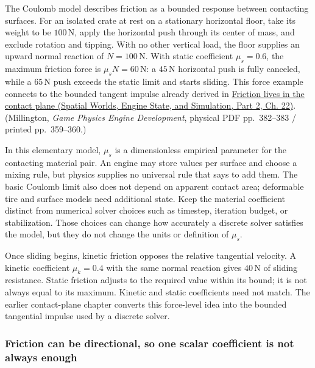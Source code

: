 The Coulomb model describes friction as a bounded response between contacting surfaces. For an isolated crate at rest on a stationary horizontal floor, take its weight to be \(100\,\mathrm N\), apply the horizontal push through its center of mass, and exclude rotation and tipping. With no other vertical load, the floor supplies an upward normal reaction of \(N=100\,\mathrm N\). With static coefficient \(\mu_s=0.6\), the maximum friction force is \(\mu_sN=60\,\mathrm N\): a \(45\,\mathrm N\) horizontal push is fully canceled, while a \(65\,\mathrm N\) push exceeds the static limit and starts sliding. This force example connects to the bounded tangent impulse already derived in \href{../05-Spatial-Worlds-Engine-State-and-Simulation-P02/main.pdf\#nameddest=06-engine-ii-ch033-friction-lives-in-the-contact-plane}{Friction lives in the contact plane (Spatial Worlds, Engine State, and Simulation, Part 2, Ch. 22)}. (Millington, \emph{Game Physics Engine Development}, physical PDF pp.~382--383 / printed pp.~359--360.)

In this elementary model, \(\mu_s\) is a dimensionless empirical parameter for the contacting material pair. An engine may store values per surface and choose a mixing rule, but physics supplies no universal rule that says to add them. The basic Coulomb limit also does not depend on apparent contact area; deformable tire and surface models need additional state. Keep the material coefficient distinct from numerical solver choices such as timestep, iteration budget, or stabilization. Those choices can change how accurately a discrete solver satisfies the model, but they do not change the units or definition of \(\mu_s\).

Once sliding begins, kinetic friction opposes the relative tangential velocity. A kinetic coefficient \(\mu_k=0.4\) with the same normal reaction gives \(40\,\mathrm N\) of sliding resistance. Static friction adjusts to the required value within its bound; it is not always equal to its maximum. Kinetic and static coefficients need not match. The earlier contact-plane chapter converts this force-level idea into the bounded tangential impulse used by a discrete solver.

\subsubsection{Friction can be directional, so one scalar coefficient is not always enough}\label{06-engine-ii-ch047-friction-can-be-directional-so-one-scalar-coefficient-is-not-always-enough}

